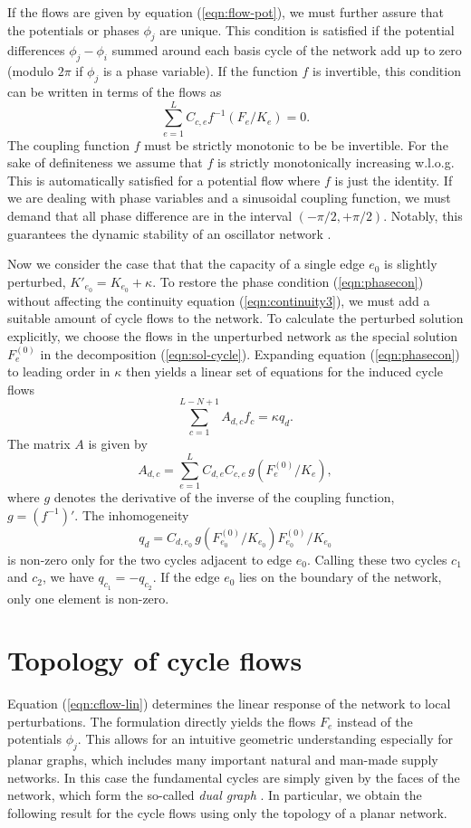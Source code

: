 \documentclass[10pt,aps,pra,twocolumn,superscriptaddress]{revtex4-1}
\newcommand{\be}{\begin{equation}}
\newcommand{\ee}{\end{equation}}
\begin{document}
If the flows are given by equation  (\ref{eqn:flow-pot}), we must further assure that the potentials or phases $\phi_j$ are unique. This condition is satisfied if the potential differences $\phi_j - \phi_i$ summed around each basis cycle of the network add up to zero (modulo $2\pi$ if $\phi_j$ is a phase variable). If the function $f$ is invertible, this condition can be written in terms of the flows as 
\be
   \sum_{e=1}^L C_{c,e} f^{-1}(F_e/K_e) = 0.
   \label{eqn:phasecon}
\ee
The coupling function $f$ must be strictly monotonic to be be invertible. For
the sake of definiteness we assume that $f$ is strictly monotonically increasing w.l.o.g.
This is automatically satisfied for a potential flow where $f$ is just the identity. 
If we are dealing with phase variables and a sinusoidal coupling function, we must 
demand that all phase difference are in the interval $(-\pi/2,+\pi/2)$. Notably, this 
guarantees the dynamic stability of an oscillator network  \cite{14bifurcation}.

Now we consider the case that that the capacity of a single edge $e_0$ is slightly perturbed, 
$K'_{e_0} = K_{e_0} + \kappa$. To restore the phase condition (\ref{eqn:phasecon}) without affecting the continuity equation (\ref{eqn:continuity3}), we must add a suitable amount of cycle flows to the network. To calculate the perturbed solution explicitly, we choose the flows in the unperturbed network as the special solution $F_e^{(0)}$ in the decomposition (\ref{eqn:sol-cycle}). Expanding equation  (\ref{eqn:phasecon}) to leading order in $\kappa$ then yields a linear set of equations for the induced cycle flows
\be
    \sum_{c=1}^{L-N+1} A_{d,c} f_c = \kappa q_d.  
    \label{eqn:cflow-lin}
\ee
The matrix $A$ is given by 
\be
   A_{d,c} = \sum_{e=1}^L C_{d,e} C_{c,e} \, g(F^{(0)}_e/K_e),
   \label{eqn:def-A}
\ee  
where $g$ denotes the derivative of the inverse of the coupling function, $g = (f^{-1})'$. 
The inhomogeneity
\be
   q_d = C_{d,e_0} \, g(F^{(0)}_{e_0}/K_{e_0}) F^{(0)}_{e_0}/K_{e_0}
\ee
is non-zero only for the two cycles adjacent to edge $e_0$. Calling these two cycles $c_1$ and $c_2$, we have $q_{c_1} = - q_{c_2}$. If the edge $e_0$ lies on the boundary of the network, only one element is non-zero.


\section{Topology of cycle flows}
\label{sec:domains}

Equation (\ref{eqn:cflow-lin}) determines the linear response of the network to local perturbations. The formulation directly yields the flows $F_e$ instead of the potentials $\phi_j$. This allows for an intuitive geometric understanding especially for planar graphs, which includes many important natural and man-made supply networks. In this case the fundamental cycles are simply given by the faces of the network, which form
the so-called \emph{dual graph} \cite{Dies10}. In particular, we obtain the following result for the cycle flows using only the topology of a planar network.
\end{document}
